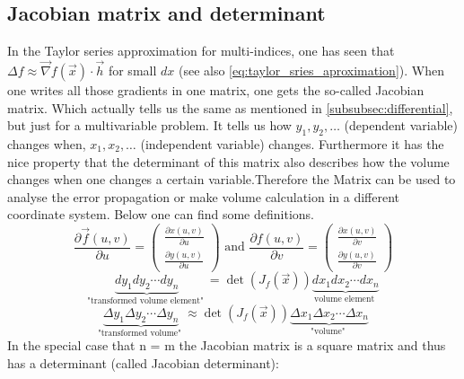 









\subsection{Jacobian matrix and determinant}
In the Taylor series approximation for multi-indices, one has seen that $\Delta f \approx \vec{\nabla} f(\vec{x}) \cdot \vec{h}$ for small $dx$ (see also \autoref{eq:taylor_sries_aproximation}). When one writes all those gradients in one matrix, one gets the so-called Jacobian matrix. Which actually tells us the same as mentioned in \autoref{subsubsec:differential}, but just for a multivariable problem. It tells us how $y_1,y_2, \ldots$ (dependent variable) changes when,  $x_1,x_2, \ldots$ (independent variable) changes. Furthermore it has the nice property that the determinant of this matrix also describes how the volume changes when one changes a certain variable.Therefore the Matrix can be used to analyse the error propagation or make volume calculation in a different coordinate system. \newline
Below one can find some definitions.
\begin{equation}
\frac{\partial \vec{f}(u, v)}{\partial u}=\left(\begin{array}{c}
\frac{\partial x(u, v)}{\partial u} \\
\frac{\partial y(u, v)}{\partial u}
\end{array}\right) \text { and } \frac{\partial f(u, v)}{\partial v}=\left(\begin{array}{c}
\frac{\partial x(u, v)}{\partial v} \\
\frac{\partial y(u, v)}{\partial v}
\end{array}\right)
\end{equation}
\begin{equation}
\underbrace{d y_1 d y_2 \cdots d y_n}_{\text {"transformed volume element" }}=\operatorname{det}\left(J_f(\vec{x})\right) \underbrace{d x_1 d x_2 \cdots d x_n}_{\text {volume element }}
\end{equation}
\begin{equation}
\underbrace{\Delta y_1 \Delta y_2 \cdots \Delta y_n}_{\text {"transformed volume" }} \approx \operatorname{det}\left(J_f(\vec{x})\right) \underbrace{\Delta x_1 \Delta x_2 \cdots \Delta x_n}_{\text {"volume" }}
\end{equation}
In the special case that n = m the Jacobian matrix is a square matrix and thus has a determinant (called Jacobian determinant):

